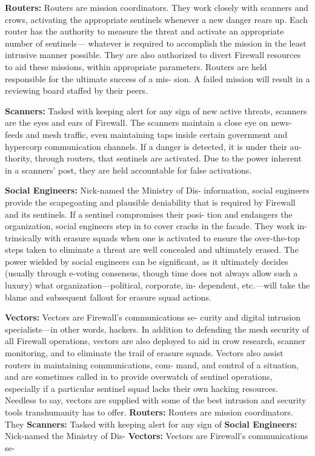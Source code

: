 \textbf{Routers:} Routers are mission coordinators. They 
work closely with scanners and crows, activating the 
appropriate sentinels whenever a new danger rears up. 
Each router has the authority to measure the threat 
and activate an appropriate number of sentinels—
whatever is required to accomplish the mission in 
the least intrusive manner possible. They are also 
authorized to divert Firewall resources to aid these 
missions, within appropriate parameters. Routers are 
held responsible for the ultimate success of a mis-
sion. A failed mission will result in a reviewing board 
staffed by their peers. 

\textbf{Scanners:} Tasked with keeping alert for any sign of 
new active threats, scanners are the eyes and ears of 
Firewall. The scanners maintain a close eye on news-
feeds and mesh traffic, even maintaining taps inside 
certain government and hypercorp communication 
channels. If a danger is detected, it is under their au-
thority, through routers, that sentinels are activated. 
Due to the power inherent in a scanners' post, they 
are held accountable for false activations.

\textbf{Social Engineers:} Nick-named the Ministry of Dis-
information, social engineers provide the scapegoating 
and plausible deniability that is required by Firewall 
and its sentinels. If a sentinel compromises their posi-
tion and endangers the organization, social engineers 
step in to cover cracks in the facade. They work in-
trinsically with erasure squads when one is activated 
to ensure the over-the-top steps taken to eliminate a 
threat are well concealed and ultimately erased. The 
power wielded by social engineers can be significant, 
as it ultimately decides (usually through e-voting 
consensus, though time does not always allow such 
a luxury) what organization—political, corporate, in-
dependent, etc.—will take the blame and subsequent 
fallout for erasure squad actions. 

\textbf{Vectors:} Vectors are Firewall's communications se-
curity and digital intrusion specialists—in other words, 
hackers. In addition to defending the mesh security 
of all Firewall operations, vectors are also deployed 
to aid in crow research, scanner monitoring, and to 
eliminate the trail of erasure squads. Vectors also 
assist routers in maintaining communications, com-
mand, and control of a situation, and are sometimes 
called in to provide overwatch of sentinel operations, 
especially if a particular sentinel squad lacks their 
own hacking resources. Needless to say, vectors are 
supplied with some of the best intrusion and security 
tools transhumanity has to offer.
\textbf{Routers:} Routers are mission coordinators. They 
\textbf{Scanners:} Tasked with keeping alert for any sign of 
\textbf{Social Engineers:} Nick-named the Ministry of Dis-
\textbf{Vectors:} Vectors are Firewall's communications se-

